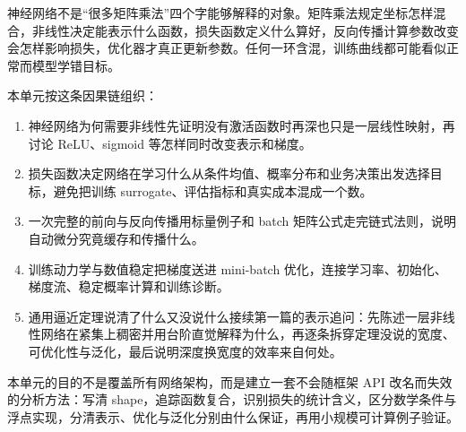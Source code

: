 神经网络不是``很多矩阵乘法''四个字能够解释的对象。矩阵乘法规定坐标怎样混合，非线性决定能表示什么函数，损失函数定义什么算好，反向传播计算参数改变会怎样影响损失，优化器才真正更新参数。任何一环含混，训练曲线都可能看似正常而模型学错目标。

本单元按这条因果链组织：

\begin{enumerate}
\def\labelenumi{\arabic{enumi}.}
\tightlist
\item
  神经网络为何需要非线性先证明没有激活函数时再深也只是一层线性映射，再讨论 ReLU、sigmoid 等怎样同时改变表示和梯度。
\item
  损失函数决定网络在学习什么从条件均值、概率分布和业务决策出发选择目标，避免把训练 surrogate、评估指标和真实成本混成一个数。
\item
  一次完整的前向与反向传播用标量例子和 batch 矩阵公式走完链式法则，说明自动微分究竟缓存和传播什么。
\item
  训练动力学与数值稳定把梯度送进 mini-batch 优化，连接学习率、初始化、梯度流、稳定概率计算和训练诊断。
\item
  通用逼近定理说清了什么又没说什么接续第一篇的表示追问：先陈述一层非线性网络在紧集上稠密并用台阶直觉解释为什么，再逐条拆穿定理没说的宽度、可优化性与泛化，最后说明深度换宽度的效率来自何处。
\end{enumerate}

本单元的目的不是覆盖所有网络架构，而是建立一套不会随框架 API 改名而失效的分析方法：写清 shape，追踪函数复合，识别损失的统计含义，区分数学条件与浮点实现，分清表示、优化与泛化分别由什么保证，再用小规模可计算例子验证。
